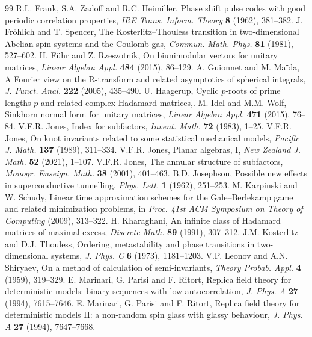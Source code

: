 \documentclass[11pt,a4paper]{article}
\theoremstyle{remark}
\begin{document}
\begin{thebibliography}{99}
R.L. Frank, S.A. Zadoff and R.C. Heimiller, Phase shift pulse codes with good periodic correlation properties, \emph{IRE Trans. Inform. Theory} \textbf{8} (1962), 381--382.
J. Fr\"ohlich and T. Spencer, The Kosterlitz--Thouless transition in two-dimensional Abelian spin systems and the Coulomb gas, \emph{Commun. Math. Phys.} \textbf{81} (1981), 527--602.
H. F\"uhr and Z. Rzeszotnik, On biunimodular vectors for unitary matrices, \emph{Linear Algebra Appl.} \textbf{484} (2015), 86--129.
A. Guionnet and M. Ma\"ida, A Fourier view on the R-transform and related asymptotics of spherical integrals, \emph{J. Funct. Anal.} \textbf{222} (2005), 435--490.
U. Haagerup, Cyclic $p$-roots of prime lengths $p$ and related complex Hadamard matrices,.
M. Idel and M.M. Wolf, Sinkhorn normal form for unitary matrices, \emph{Linear Algebra Appl.} \textbf{471} (2015), 76--84.
V.F.R. Jones, Index for subfactors, \emph{Invent. Math.} \textbf{72} (1983), 1--25.
V.F.R. Jones, On knot invariants related to some statistical mechanical models, \emph{Pacific J. Math.} \textbf{137} (1989), 311--334.
V.F.R. Jones, Planar algebras, I, \emph{New Zealand J. Math.} \textbf{52} (2021), 1--107.
V.F.R. Jones, The annular structure of subfactors, \emph{Monogr. Enseign. Math.} \textbf{38} (2001), 401--463.
B.D. Josephson, Possible new effects in superconductive tunnelling, \emph{Phys. Lett.} \textbf{1} (1962), 251--253.
M. Karpinski and W. Schudy, Linear time approximation schemes for the Gale--Berlekamp game and related minimization problems, in \emph{Proc. 41st ACM Symposium on Theory of Computing} (2009), 313--322.
H. Kharaghani, An infinite class of Hadamard matrices of maximal excess, \emph{Discrete Math.} \textbf{89} (1991), 307--312.
J.M. Kosterlitz and D.J. Thouless, Ordering, metastability and phase transitions in two-dimensional systems, \emph{J. Phys. C} \textbf{6} (1973), 1181--1203.
V.P. Leonov and A.N. Shiryaev, On a method of calculation of semi-invariants, \emph{Theory Probab. Appl.} \textbf{4} (1959), 319--329.
E. Marinari, G. Parisi and F. Ritort, Replica field theory for deterministic models: binary sequences with low autocorrelation, \emph{J. Phys. A} \textbf{27} (1994), 7615--7646.
E. Marinari, G. Parisi and F. Ritort, Replica field theory for deterministic models II: a non-random spin glass with glassy behaviour, \emph{J. Phys. A} \textbf{27} (1994), 7647--7668.

\end{thebibliography}
\end{document}
